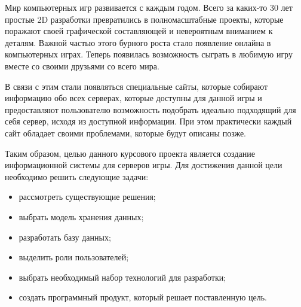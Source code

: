 \maketableofcontents

\intro

Мир компьютерных игр развивается с каждым годом. Всего за каких-то 30 лет простые 2D разработки превратились в полномасштабные проекты, которые поражают своей графической составляющей и невероятным вниманием к деталям. Важной частью этого бурного роста стало появление онлайна в компьютерных играх. Теперь появилась возможность сыграть в любимую игру вместе со своими друзьями со всего мира.

В связи с этим стали появляться специальные сайты, которые собирают информацию обо всех серверах, которые доступны для данной игры и предоставляют пользователю возможность подобрать идеально подходящий для себя сервер, исходя из доступной информации. При этом практически каждый сайт обладает своими проблемами, которые будут описаны позже.

Таким образом, целью данного курсового проекта является создание информационной системы для серверов игры. Для достижения данной цели необходимо решить следующие задачи:

\begin{itemize}
	\item рассмотреть существующие решения;
	\item выбрать модель хранения данных;
	\item разработать базу данных;
	\item выделить роли пользователей;
	\item выбрать необходимый набор технологий для разработки;
	\item создать программный продукт, который решает поставленную цель.
\end{itemize}

